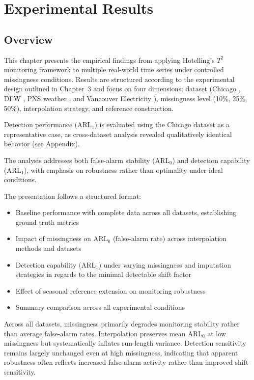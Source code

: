 \clearpage
\section{Experimental Results}

\subsection{Overview}

This chapter presents the empirical findings from applying Hotelling's $T^2$ monitoring framework to multiple real-world time series under controlled missingness conditions. Results are structured according to the experimental design outlined in Chapter~3 and focus on four dimensions: dataset (Chicago \parencite{chicago_beach_weather_2025}, DFW \parencite{dfw_weather}, PNS weather \parencite{pns_weather}, and Vancouver Electricity \parencite{makonin2015ampds}), missingness level (10\%, 25\%, 50\%), interpolation strategy, and reference construction.

Detection performance (\ac{ARL}$_1$) is evaluated using the Chicago dataset as a representative case, as cross-dataset analysis revealed qualitatively identical behavior (see Appendix).

The analysis addresses both false-alarm stability (\ac{ARL}$_0$) and detection capability (\ac{ARL}$_1$), with emphasis on robustness rather than optimality under ideal conditions.

The presentation follows a structured format:
\begin{itemize}
	\item Baseline performance with complete data across all datasets, establishing ground truth metrics
	\item Impact of missingness on \ac{ARL}$_0$ (false-alarm rate) across interpolation methods and datasets
	\item Detection capability (\ac{ARL}$_1$) under varying missingness and imputation strategies in regards to the minimal detectable shift factor
	\item Effect of seasonal reference extension on monitoring robustness
	\item Summary comparison across all experimental conditions
\end{itemize}

Across all datasets, missingness primarily degrades monitoring stability rather than average false-alarm rates. Interpolation preserves mean \ac{ARL}$_0$ at low missingness but systematically inflates run-length variance. Detection sensitivity remains largely unchanged even at high missingness, indicating that apparent robustness often reflects increased false-alarm activity rather than improved shift sensitivity.

